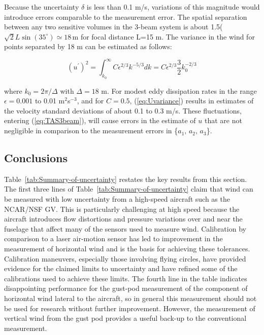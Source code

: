 \documentclass[12pt,twoside,english]{article}\usepackage[]{graphicx}\usepackage[]{color}
\let\OrgIndex\index
\renewcommand*{\index}[1]{\OrgIndex{#1}}
\begin{document}
Because the uncertainty $\delta$ is less than 0.1 m/s, variations of this magnitude would introduce errors comparable to the measurement error. The spatial separation between any two sensitive volumes in the 3-beam system is about 1.5($\sqrt{2}L\sin(35^{\circ})\simeq18$\,m for focal distance L=15 m. The variance in the wind for points separated by 18 m can be estimated as follows: 

\begin{equation}
(u^{\prime})^{2}=\int_{k_{0}}^{\infty}C\epsilon^{2/3}k^{-5/3}dk=C\epsilon^{2/3}\frac{3}{2}k_{0}^{-2/3}\label{eq:Uvariance} 
\end{equation}


where $k_{0}=2\pi/\Delta$ with $\Delta=18$ m. For modest eddy dissipation rates in the range $\epsilon=0.001$ to 0.01 m$^{2}$s$^{-3}$, and for $C=0.5$, (\ref{eq:Uvariance}) results in estimates of the velocity standard deviations of about 0.1 to 0.3 m/s. These fluctuations, entering (\ref{eq:TAS3beam}), will cause errors in the estimate of $u$ that are not negligible in comparison to the measurement errors in \{$a_{1},\,a_{2},\,a_{3}$\}. 


\subsection{Conclusions\label{sub:Conclusions}}

Table~\ref{tab:Summary-of-uncertainty} restates the key results from this section. 
The first three lines of Table~\ref{tab:Summary-of-uncertainty} claim that wind can be measured with low uncertainty from a high-speed aircraft such as the NCAR/NSF GV. This is particularly challenging at high speed because the aircraft introduces flow distortions and pressure variations over and near the fuselage that affect many of the sensors used to measure wind. Calibration by comparison to a laser air-motion sensor has led to improvement in the measurement of horizontal wind and is the basis for achieving these tolerances. Calibration maneuvers, especially those involving flying circles, have provided evidence for the claimed limits to uncertainty and have refined some of the calibrations used to achieve these limits. The fourth line in the table indicates disappointing performance for the gust-pod measurement of the component of horizontal wind lateral to the aircraft, so in general this measurement should not be used for research without further improvement. However, the measurement of vertical wind from the gust pod provides a useful back-up to the conventional measurement. 
\end{document}
